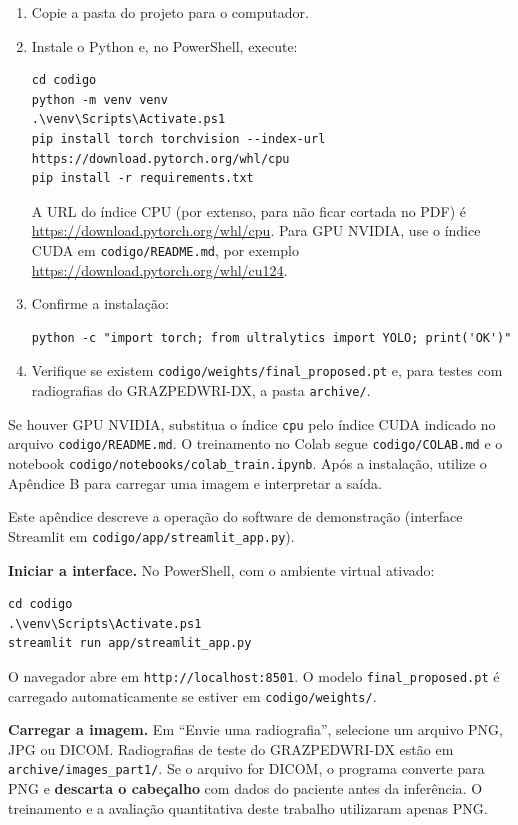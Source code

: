 \documentclass[12pt,oneside,a4paper,chapter=TITLE,section=TITLE,sumario=tradicional]{abntex2}
\begin{document}
\begin{enumerate}
    \item Copie a pasta do projeto para o computador.
    \item Instale o Python e, no PowerShell, execute:
\begin{verbatim}
cd codigo
python -m venv venv
.\venv\Scripts\Activate.ps1
pip install torch torchvision --index-url https://download.pytorch.org/whl/cpu
pip install -r requirements.txt
\end{verbatim}
A URL do índice CPU (por extenso, para não ficar cortada no PDF) é \url{https://download.pytorch.org/whl/cpu}. Para GPU NVIDIA, use o índice CUDA em \texttt{codigo/README.md}, por exemplo \url{https://download.pytorch.org/whl/cu124}.
    \item Confirme a instalação:
\begin{verbatim}
python -c "import torch; from ultralytics import YOLO; print('OK')"
\end{verbatim}
    \item Verifique se existem \texttt{codigo/weights/final\_proposed.pt} e, para testes com radiografias do GRAZPEDWRI-DX, a pasta \texttt{archive/}.
\end{enumerate}

Se houver GPU NVIDIA, substitua o índice \texttt{cpu} pelo índice CUDA indicado no arquivo \texttt{codigo/README.md}. O treinamento no Colab segue \texttt{codigo/COLAB.md} e o notebook \texttt{codigo/notebooks/colab\_train.ipynb}. Após a instalação, utilize o Apêndice B para carregar uma imagem e interpretar a saída.


Este apêndice descreve a operação do software de demonstração (interface Streamlit em \texttt{codigo/app/streamlit\_app.py}).

\textbf{Iniciar a interface.} No PowerShell, com o ambiente virtual ativado:

\begin{verbatim}
cd codigo
.\venv\Scripts\Activate.ps1
streamlit run app/streamlit_app.py
\end{verbatim}

O navegador abre em \texttt{http://localhost:8501}. O modelo \texttt{final\_proposed.pt} é carregado automaticamente se estiver em \texttt{codigo/weights/}.

\textbf{Carregar a imagem.} Em ``Envie uma radiografia'', selecione um arquivo PNG, JPG ou DICOM. Radiografias de teste do GRAZPEDWRI-DX estão em \texttt{archive/images\_part1/}. Se o arquivo for DICOM, o programa converte para PNG e \textbf{descarta o cabeçalho} com dados do paciente antes da inferência. O treinamento e a avaliação quantitativa deste trabalho utilizaram apenas PNG.
\end{document}
